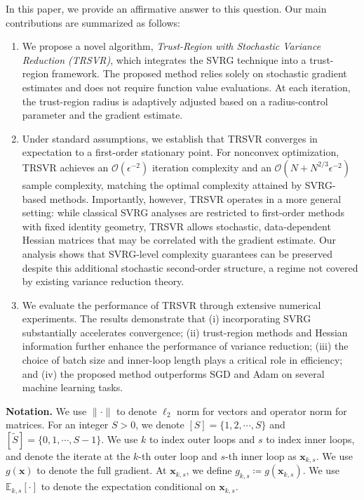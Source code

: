 \documentclass{article}
\newcommand{\bx}{\boldsymbol{x}}
\theoremstyle{plain}
\theoremstyle{definition}
\theoremstyle{remark}
\begin{document}
In this paper, we provide an affirmative answer to this question. Our main contributions are summarized as follows:
\begin{enumerate}
\item We propose a novel algorithm, \emph{Trust-Region with Stochastic Variance Reduction (TRSVR)}, which integrates the SVRG technique into a trust-region framework. The proposed method relies solely on stochastic gradient estimates and does not require function value evaluations. At each iteration, the trust-region radius is adaptively adjusted based on a radius-control parameter and the gradient estimate.

\item Under standard assumptions, we establish that TRSVR converges in expectation to a first-order stationary point. For nonconvex optimization, TRSVR achieves an $\mathcal{O}(\epsilon^{-2})$ iteration complexity and an $\mathcal{O}(N + N^{2/3}\epsilon^{-2})$ sample complexity, matching the optimal complexity attained by SVRG-based methods. Importantly, however, TRSVR operates in a more general setting: while classical SVRG analyses are restricted to first-order methods with fixed identity geometry, TRSVR allows stochastic, data-dependent Hessian matrices that may be correlated with the gradient estimate. Our analysis shows that SVRG-level complexity guarantees can be preserved despite this additional stochastic second-order structure, a regime not covered by existing variance reduction theory.

\item We evaluate the performance of TRSVR through extensive numerical experiments. The results demonstrate that (i) incorporating SVRG substantially accelerates convergence; (ii) trust-region methods and Hessian information further enhance the performance of variance reduction; (iii) the choice of batch size and inner-loop length plays a critical role in efficiency; and (iv) the proposed method outperforms SGD and Adam on several machine learning tasks.
\end{enumerate}





\textbf{Notation.}  We use $\|\cdot\|$ to denote $\ell_2$ norm for vectors and operator norm for matrices. For an integer $S>0$, we denote $[S]=\{1,2,\cdots, S\}$ and $[\tilde{S}]= \{0,1,\cdots, S-1\}$. We use $k$ to index outer loops and $s$ to index inner loops, and denote the iterate at the $k$-th outer loop and $s$-th inner loop as $\bx_{k,s}$. We use $g(\bx)$ to denote the full gradient. At $\bx_{k,s}$, we define $g_{k,s}\coloneqq g(\bx_{k,s})$. We use $\mathbb{E}_{k,s}[\cdot]$ to denote the expectation conditional on $\bx_{k,s}$.
\end{document}

